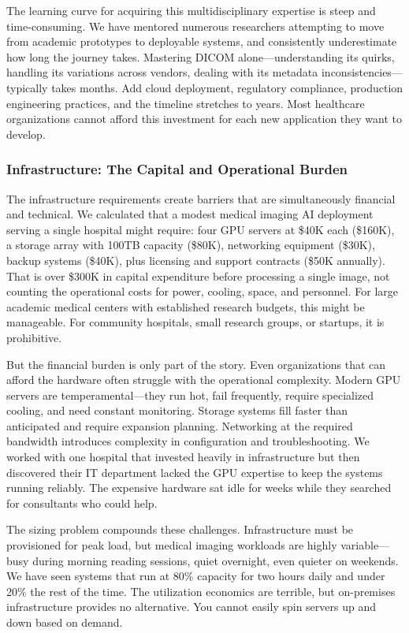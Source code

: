 \documentclass[12pt,a4paper]{article}
\begin{document}
The learning curve for acquiring this multidisciplinary expertise is steep and time-consuming. We have mentored numerous researchers attempting to move from academic prototypes to deployable systems, and consistently underestimate how long the journey takes. Mastering DICOM alone—understanding its quirks, handling its variations across vendors, dealing with its metadata inconsistencies—typically takes months. Add cloud deployment, regulatory compliance, production engineering practices, and the timeline stretches to years. Most healthcare organizations cannot afford this investment for each new application they want to develop.

\subsubsection{Infrastructure: The Capital and Operational Burden}

The infrastructure requirements create barriers that are simultaneously financial and technical. We calculated that a modest medical imaging AI deployment serving a single hospital might require: four GPU servers at \$40K each (\$160K), a storage array with 100TB capacity (\$80K), networking equipment (\$30K), backup systems (\$40K), plus licensing and support contracts (\$50K annually). That is over \$300K in capital expenditure before processing a single image, not counting the operational costs for power, cooling, space, and personnel. For large academic medical centers with established research budgets, this might be manageable. For community hospitals, small research groups, or startups, it is prohibitive.

But the financial burden is only part of the story. Even organizations that can afford the hardware often struggle with the operational complexity. Modern GPU servers are temperamental—they run hot, fail frequently, require specialized cooling, and need constant monitoring. Storage systems fill faster than anticipated and require expansion planning. Networking at the required bandwidth introduces complexity in configuration and troubleshooting. We worked with one hospital that invested heavily in infrastructure but then discovered their IT department lacked the GPU expertise to keep the systems running reliably. The expensive hardware sat idle for weeks while they searched for consultants who could help.

The sizing problem compounds these challenges. Infrastructure must be provisioned for peak load, but medical imaging workloads are highly variable—busy during morning reading sessions, quiet overnight, even quieter on weekends. We have seen systems that run at 80\% capacity for two hours daily and under 20\% the rest of the time. The utilization economics are terrible, but on-premises infrastructure provides no alternative. You cannot easily spin servers up and down based on demand.
\end{document}
